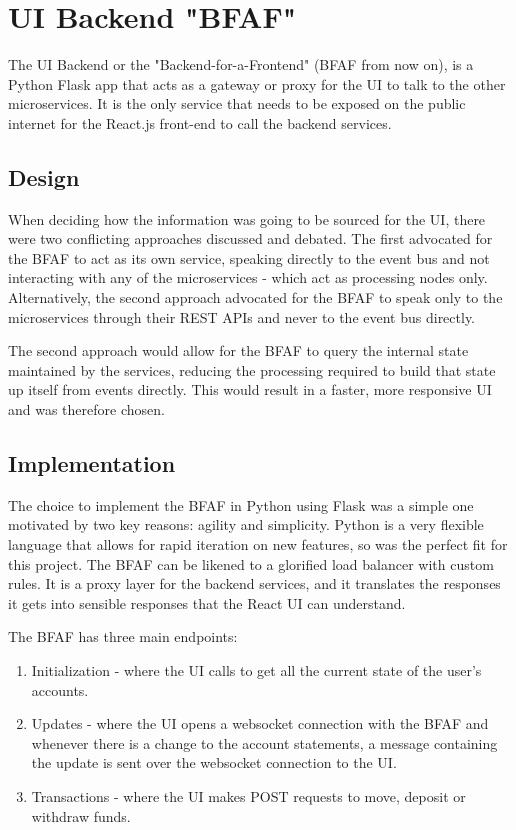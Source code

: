 \documentclass{l3proj}
\begin{document}
\section{UI Backend "BFAF"}
\label{sec:backend}
The UI Backend or the "Backend-for-a-Frontend" (BFAF from now on), is a Python Flask app that acts as a gateway or proxy for the UI to talk to the other microservices. It is the only service that needs to be exposed on the public internet for the React.js front-end to call the backend services.

\subsection{Design}
When deciding how the information was going to be sourced for the UI, there were two conflicting approaches discussed and debated. The first advocated for the BFAF to act as its own service, speaking directly to the event bus and not interacting with any of the microservices - which act as processing nodes only. Alternatively, the second approach advocated for the BFAF to speak only to the microservices through their REST APIs and never to the event bus directly.

The second approach would allow for the BFAF to query the internal state maintained by the services, reducing the processing required to build that state up itself from events directly. This would result in a faster, more responsive UI and was therefore chosen.

\subsection{Implementation}
The choice to implement the BFAF in Python using Flask was a simple one motivated by two key reasons: agility and simplicity. Python is a very flexible language that allows for rapid iteration on new features, so was the perfect fit for this project. The BFAF can be likened to a glorified load balancer with custom rules. It is a proxy layer for the backend services, and it translates the responses it gets into sensible responses that the React UI can understand.

The BFAF has three main endpoints:
\begin{enumerate}
    \item Initialization - where the UI calls to get all the current state of the user's accounts.
    \item Updates - where the UI opens a websocket connection with the BFAF and whenever there is a change to the account statements, a message containing the update is sent over the websocket connection to the UI.
    \item Transactions - where the UI makes POST requests to move, deposit or withdraw funds.
\end{enumerate}
\end{document}
